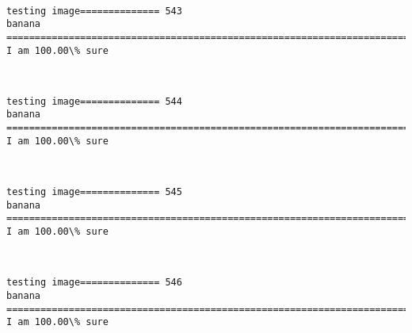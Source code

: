 \documentclass[11pt]{article}
\begin{document}
    \begin{center}
    \end{center}
    { \hspace*{\fill} \\}
    
    \begin{Verbatim}[commandchars=\\\{\}]
testing image============== 543
banana
============================================================================
I am 100.00\% sure

    \end{Verbatim}

    \begin{center}
    \end{center}
    { \hspace*{\fill} \\}
    
    \begin{Verbatim}[commandchars=\\\{\}]
testing image============== 544
banana
============================================================================
I am 100.00\% sure

    \end{Verbatim}

    \begin{center}
    \end{center}
    { \hspace*{\fill} \\}
    
    \begin{Verbatim}[commandchars=\\\{\}]
testing image============== 545
banana
============================================================================
I am 100.00\% sure

    \end{Verbatim}

    \begin{center}
    \end{center}
    { \hspace*{\fill} \\}
    
    \begin{Verbatim}[commandchars=\\\{\}]
testing image============== 546
banana
============================================================================
I am 100.00\% sure

    \end{Verbatim}
\end{document}
